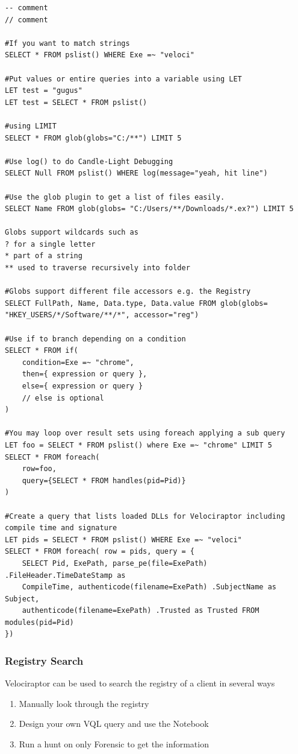 \begin{lstlisting}
-- comment
// comment

#If you want to match strings
SELECT * FROM pslist() WHERE Exe =~ "veloci"

#Put values or entire queries into a variable using LET
LET test = "gugus"
LET test = SELECT * FROM pslist()

#using LIMIT
SELECT * FROM glob(globs="C:/**") LIMIT 5

#Use log() to do Candle-Light Debugging
SELECT Null FROM pslist() WHERE log(message="yeah, hit line")

#Use the glob plugin to get a list of files easily.
SELECT Name FROM glob(globs= "C:/Users/**/Downloads/*.ex?") LIMIT 5

Globs support wildcards such as
? for a single letter
* part of a string
** used to traverse recursively into folder

#Globs support different file accessors e.g. the Registry
SELECT FullPath, Name, Data.type, Data.value FROM glob(globs= "HKEY_USERS/*/Software/**/*", accessor="reg")

#Use if to branch depending on a condition
SELECT * FROM if(
    condition=Exe =~ "chrome",
    then={ expression or query },
    else={ expression or query }
    // else is optional
)

#You may loop over result sets using foreach applying a sub query
LET foo = SELECT * FROM pslist() where Exe =~ "chrome" LIMIT 5
SELECT * FROM foreach(
    row=foo,
    query={SELECT * FROM handles(pid=Pid)}
)

#Create a query that lists loaded DLLs for Velociraptor including compile time and signature
LET pids = SELECT * FROM pslist() WHERE Exe =~ "veloci"
SELECT * FROM foreach( row = pids, query = {
    SELECT Pid, ExePath, parse_pe(file=ExePath) .FileHeader.TimeDateStamp as
    CompileTime, authenticode(filename=ExePath) .SubjectName as Subject,
    authenticode(filename=ExePath) .Trusted as Trusted FROM modules(pid=Pid)
})
\end{lstlisting}

\subsubsection{Registry Search}
Velociraptor can be used to search the registry of a client in several ways
\begin{enumerate}
    \item Manually look through the registry
    \item Design your own VQL query and use the Notebook
    \item Run a hunt on only Forensic to get the information
\end{enumerate}


